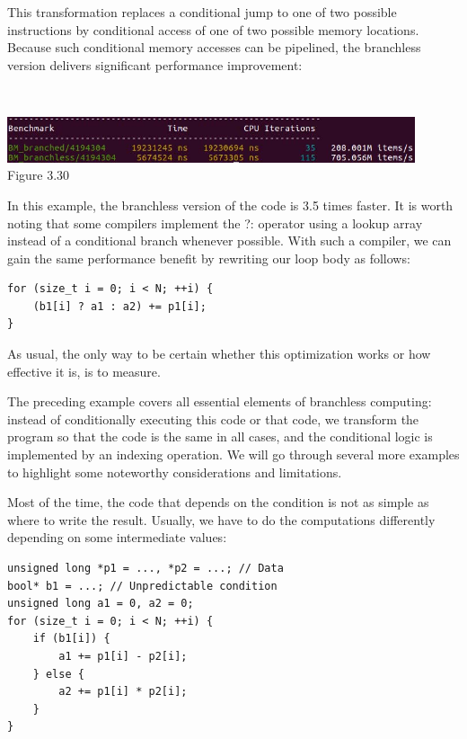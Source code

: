 This transformation replaces a conditional jump to one of two possible instructions by conditional access of one of two possible memory locations. Because such conditional memory accesses can be pipelined, the branchless version delivers significant performance improvement:

\hspace*{\fill} \\ %
\begin{center}
\includegraphics[width=0.9\textwidth]{content/1/chapter3/images/30.jpg}\\
Figure 3.30
\end{center}

In this example, the branchless version of the code is 3.5 times faster. It is worth noting that some compilers implement the ?: operator using a lookup array instead of a conditional branch whenever possible. With such a compiler, we can gain the same performance benefit by rewriting our loop body as follows:

\begin{lstlisting}[style=styleCXX]
for (size_t i = 0; i < N; ++i) {
	(b1[i] ? a1 : a2) += p1[i];
}
\end{lstlisting}

As usual, the only way to be certain whether this optimization works or how effective it is, is to measure.

The preceding example covers all essential elements of branchless computing: instead of conditionally executing this code or that code, we transform the program so that the code is the same in all cases, and the conditional logic is implemented by an indexing operation. We will go through several more examples to highlight some noteworthy considerations and limitations.


Most of the time, the code that depends on the condition is not as simple as where to write the result. Usually, we have to do the computations differently depending on some intermediate values:

\begin{lstlisting}[style=styleCXX]
unsigned long *p1 = ..., *p2 = ...; // Data
bool* b1 = ...; // Unpredictable condition
unsigned long a1 = 0, a2 = 0;
for (size_t i = 0; i < N; ++i) {
	if (b1[i]) {
		a1 += p1[i] - p2[i];
	} else {
		a2 += p1[i] * p2[i];
	}
}
\end{lstlisting}

